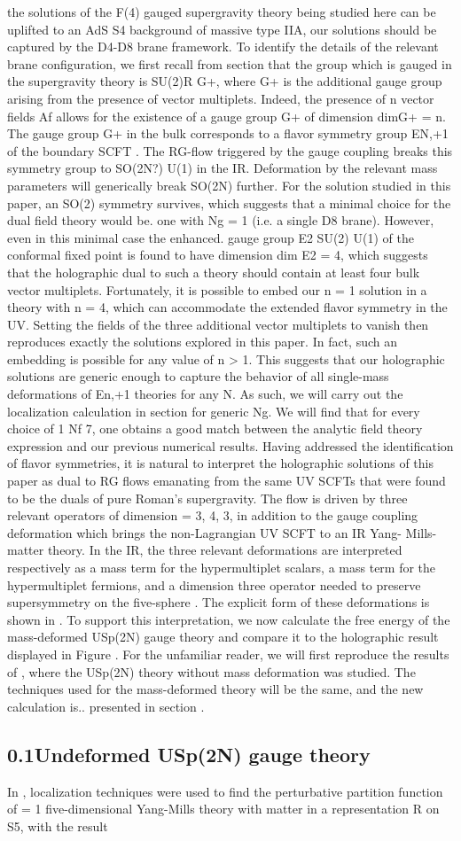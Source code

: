 \documentclass{article}
\begin{document}
\sloppy

the solutions of the F(4) gauged supergravity theory being studied here can be uplifted to
an AdS  S4 background of massive type IIA, our solutions should be captured by the D4-D8
brane framework. To identify the details of the relevant brane configuration, we first recall
from section that the group which is gauged in the supergravity theory is SU(2)R  G+, where
G+ is the additional gauge group arising from the presence of vector multiplets. Indeed, the
presence of n vector fields Af allows for the existence of a gauge group G+ of dimension
dimG+ = n. The gauge group G+ in the bulk corresponds to a flavor symmetry group
EN,+1 of the boundary SCFT . The RG-flow triggered by the gauge coupling breaks this
symmetry group to SO(2N?)  U(1) in the IR. Deformation by the relevant mass parameters
will generically break SO(2N) further. For the solution studied in this paper, an SO(2)
symmetry survives, which suggests that a minimal choice for the dual field theory would be.
one with Ng = 1 (i.e. a single D8 brane). However, even in this minimal case the enhanced.
gauge group E2  SU(2)  U(1) of the conformal fixed point is found to have dimension
dim E2 = 4, which suggests that the holographic dual to such a theory should contain at
least four bulk vector multiplets. Fortunately, it is possible to embed our n = 1 solution
in a theory with n = 4, which can accommodate the extended flavor symmetry in the UV.
Setting the fields of the three additional vector multiplets to vanish then reproduces exactly
the solutions explored in this paper. In fact, such an embedding is possible for any value
of n > 1. This suggests that our holographic solutions are generic enough to capture the
behavior of all single-mass deformations of En,+1 theories for any N. As such, we will carry
out the localization calculation in section for generic Ng. We will find that for every choice
of 1  Nf  7, one obtains a good match between the analytic field theory expression and
our previous numerical results. Having addressed the identification of flavor symmetries, it
is natural to interpret the holographic solutions of this paper as dual to RG flows emanating
from the same UV SCFTs that were found to be the duals of pure Roman's supergravity.
The flow is driven by three relevant operators of dimension  = 3, 4, 3, in addition to the
gauge coupling deformation which brings the non-Lagrangian UV SCFT to an IR Yang-
Mills-matter theory. In the IR, the three relevant deformations are interpreted respectively
as a mass term for the hypermultiplet scalars, a mass term for the hypermultiplet fermions,
and a dimension three operator needed to preserve supersymmetry on the five-sphere . The
explicit form of these deformations is shown in . To support this interpretation, we now
calculate the free energy of the mass-deformed USp(2N) gauge theory and compare it to the
holographic result displayed in Figure . For the unfamiliar reader, we will first reproduce
the results of , where the USp(2N) theory without mass deformation was studied. The
techniques used for the mass-deformed theory will be the same, and the new calculation is..
presented in section .


\subsection*{0.1Undeformed USp(2N) gauge theory}


In , localization techniques were used to find the perturbative partition function of  = 1
five-dimensional Yang-Mills theory with matter in a representation R on S5, with the result
\end{document}

